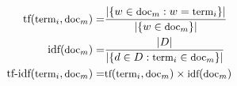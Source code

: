 \documentclass{article}
\begin{document}
\begin{eqnarray*}
  \mbox{tf}(\mbox{\small term}_i, \mbox{\small doc}_m) = & \frac{| \{ w \in \mbox{\small doc}_m : w = \mbox{\small term}_i \} |} {| \{ w \in \mbox{\small doc}_m \} |} \\
  \mbox{idf}(\mbox{\small doc}_m) = & \frac{|D|}{| \{ d \in D : \mbox{\small term}_i \in \mbox{\small doc}_m \} | } \\
  \mbox{tf-idf}(\mbox{\small term}_i, \mbox{\small doc}_m) = & \mbox{\small tf}(\mbox{\small term}_i, \mbox{\small doc}_m) \times \mbox{\small idf}(\mbox{\small doc}_m)
\end{eqnarray*}
\end{document}

